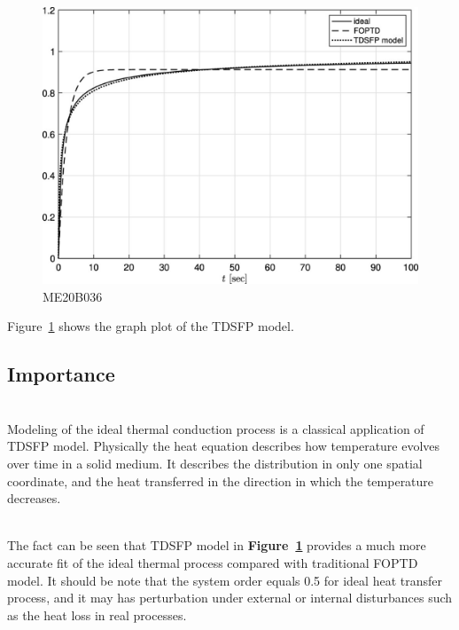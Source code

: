 \documentclass[a4paper, 12pt]{article}
\begin{document}
\begin{figure}[h]
    \begin{center}
        \includegraphics[scale=0.4]{Assgt4.eps}
    \end{center}
    \caption{ME20B036}
    \label{f1:image}
\end{figure}


Figure~\ref{f1:image} shows the graph plot of the TDSFP model.~\cite{YUAN2022108111}
\vspace{1cm}

\subsection{Importance}
\vspace{0.5cm}

\\{Modeling of the ideal thermal conduction process is a classical application of TDSFP model. Physically the heat equation describes how temperature evolves over time in a solid medium. It describes the distribution in only one spatial coordinate, and the heat transferred in the direction in which the temperature decreases.~\cite{YUAN2022108111}}
\vspace{0.5cm}

\\{The fact can be seen that TDSFP model in \textbf{Figure~\ref{f1:image}} provides a much more accurate fit of the ideal thermal process compared with traditional FOPTD model. It should be note that the system order equals 0.5 for ideal heat transfer process, and it may has perturbation under external or internal disturbances such as the heat loss in real processes.}


%
%
\end{document}
